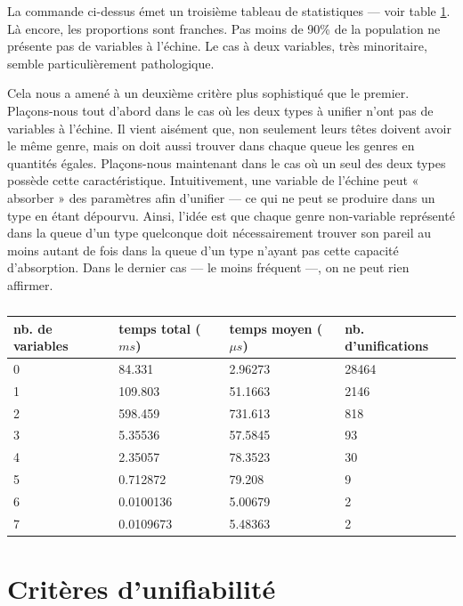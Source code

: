 \documentclass[a4paper]{report}
\theoremstyle{definition}
\begin{document}
La commande ci-dessus émet un troisième tableau de statistiques — voir table \ref{tab_meas3}. Là encore, les proportions sont franches. Pas moins de 90\% de la population ne présente pas de variables à l'échine. Le cas à deux variables, très minoritaire, semble particulièrement pathologique.

Cela nous a amené à un deuxième critère plus sophistiqué que le premier. Plaçons-nous tout d'abord dans le cas où les deux types à unifier n'ont pas de variables à l'échine. Il vient aisément que, non seulement leurs têtes doivent avoir le même genre, mais on doit aussi trouver dans chaque queue les genres en quantités égales. Plaçons-nous maintenant dans le cas où un seul des deux types possède cette caractéristique. Intuitivement, une variable de l'échine peut « absorber » des paramètres afin d'unifier — ce qui ne peut se produire dans un type en étant dépourvu. Ainsi, l'idée est que chaque genre non-variable représenté dans la queue d'un type quelconque doit nécessairement trouver son pareil au moins autant de fois dans la queue d'un type n'ayant pas cette capacité d'absorption. Dans le dernier cas — le moins fréquent —, on ne peut rien affirmer.

\begin{table}[h]
	\centering
	\begin{tabular}{|l|l|l|l|}
		\hline
			nb. de variables &
			temps total ($ms$) &
			temps moyen ($\mu s$) &
			nb. d'unifications
		\\
		\hline
			0 & 84.331 & 2.96273 & 28464
		\\
			1 & 109.803 & 51.1663 & 2146
		\\
			2 & 598.459 & 731.613 & 818
		\\
			3 & 5.35536 & 57.5845 & 93
		\\
			4 & 2.35057 & 78.3523 & 30
		\\
			5 & 0.712872 & 79.208 & 9
		\\
			6 & 0.0100136 & 5.00679 & 2
		\\
			7 & 0.0109673 & 5.48363 & 2
		\\
		\hline
	\end{tabular}
	\caption{\label{tab_meas3}}
\end{table}


\section{Critères d'unifiabilité}
\end{document}
